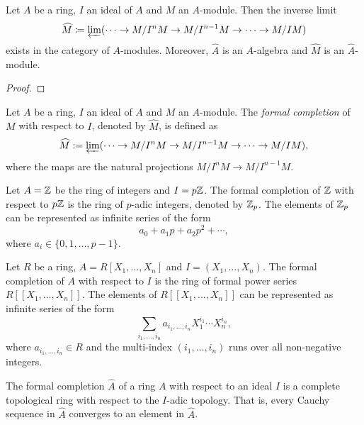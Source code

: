     \begin{lemma}\label{lem: formal completion exists}
        Let \(A\) be a ring, \(I\) an ideal of \(A\) and \(M\) an \(A\)-module. 
        Then the inverse limit
        \[ \widehat{M} \coloneqq \varprojlim ( \cdots \to M/I^nM \to M/I^{n-1}M \to \cdots \to M/IM) \]
        exists in the category of \(A\)-modules.
        Moreover, \(\widehat{A}\) is an \(A\)-algebra and \(\widehat{M}\) is an \(\widehat{A}\)-module.
    \end{lemma}
    \begin{proof}
    \end{proof}

    \begin{definition}\label{def: formal completion}
        Let \(A\) be a ring, \(I\) an ideal of \(A\) and \(M\) an \(A\)-module. 
        The \emph{formal completion} of \(M\) with respect to \(I\), denoted by \(\widehat{M}\), is defined as
        \[ \widehat{M} := \varprojlim ( \cdots \to M/I^n M \to M/I^{n-1} M \to \cdots \to M/I M), \]
        where the maps are the natural projections \(M/I^n M \to M/I^{n-1} M\).
    \end{definition}

    \begin{example}\label{eg: p-adic integer ring}
        Let \(A = {\mathbb{Z}}\) be the ring of integers and \(I = p{\mathbb{Z}}\).
        The formal completion of \({\mathbb{Z}}\) with respect to \(p{\mathbb{Z}}\) is the ring of \(p\)-adic integers, denoted by \({\mathbb{Z}}_p\).
        The elements of \({\mathbb{Z}}_p\) can be represented as infinite series of the form
        \[ a_0 + a_1 p + a_2 p^2 + \cdots, \]
        where \(a_i \in \{0, 1, \ldots, p-1\}\).
    \end{example}

    \begin{example}\label{eg: ring of formal power series}
        Let \(R\) be a ring, \(A=R[X_1, \ldots, X_n]\) and \(I = (X_1, \ldots, X_n)\).
        The formal completion of \(A\) with respect to \(I\) is the ring of formal power series \(R[[X_1, \ldots, X_n]]\).
        The elements of \(R[[X_1, \ldots, X_n]]\) can be represented as infinite series of the form
        \[ \sum_{i_1,\ldots,i_n} a_{i_1, \ldots, i_n} X_1^{i_1} \cdots X_n^{i_n}, \]
        where \(a_{i_1, \ldots, i_n} \in R\) and the multi-index \((i_1, \ldots, i_n)\) runs over all non-negative integers.
    \end{example}

    \begin{proposition}\label{prop: completion is complete}
        The formal completion \(\widehat{A}\) of a ring \(A\) with respect to an ideal \(I\) is a complete topological ring with respect to the \(I\)-adic topology.
        That is, every Cauchy sequence in \(\widehat{A}\) converges to an element in \(\widehat{A}\).
    \end{proposition}

